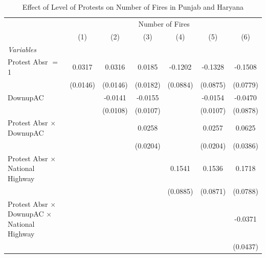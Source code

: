 
\begin{table}[htbp]
   \caption{\label{tab:protest_treat_main} Effect of Level of Protests on Number of Fires in Punjab and Haryana}
   \centering
   \begin{tabular}{lcccccc}
      \tabularnewline \midrule \midrule
       & \multicolumn{6}{c}{Number of Fires}\\
                                                                 & (1)           & (2)           & (3)           & (4)           & (5)           & (6)\\  
      \midrule
      \emph{Variables}\\
      Protest Absr $=$ 1                                         & 0.0317        & 0.0316        & 0.0185        & -0.1202       & -0.1328       & -0.1508\\   
                                                                 & (0.0146)      & (0.0146)      & (0.0182)      & (0.0884)      & (0.0875)      & (0.0779)\\   
      DownupAC                                                   &               & -0.0141       & -0.0155       &               & -0.0154       & -0.0470\\   
                                                                 &               & (0.0108)      & (0.0107)      &               & (0.0107)      & (0.0878)\\   
      Protest Absr $\times$ DownupAC                             &               &               & 0.0258        &               & 0.0257        & 0.0625\\   
                                                                 &               &               & (0.0204)      &               & (0.0204)      & (0.0386)\\   
      Protest Absr $\times$ National Highway                     &               &               &               & 0.1541        & 0.1536        & 0.1718\\   
                                                                 &               &               &               & (0.0885)      & (0.0871)      & (0.0788)\\   
      Protest Absr $\times$ DownupAC $\times$ National Highway   &               &               &               &               &               & -0.0371\\   
                                                                 &               &               &               &               &               & (0.0437)\\   

\end{tabular}
\end{table}
